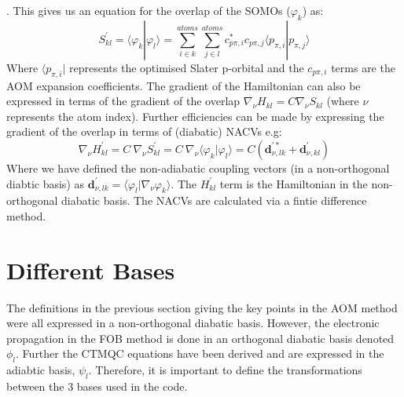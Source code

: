 \cite{spencer_fob-sh:_2016}. This gives us an equation for the overlap of the SOMOs ($\varphi_{k}$) as:
\begin{equation}
    S_{kl}^{'} = \langle \varphi_{k} | \varphi_{l} \rangle = \sum_{i \in k}^{atoms} \sum_{j \in l}^{atoms} c_{p\pi, i}^{*} c_{p\pi, j} \langle p_{\pi, i}|p_{\pi, j}\rangle
    \label{eq:P-orbital-overlap}
\end{equation}
Where $\langle p_{\pi, i} |$ represents the optimised Slater p-orbital and the $c_{p\pi, i}$ terms are the AOM expansion coefficients. The gradient of the Hamiltonian can also be expressed in terms of the gradient of the overlap $\nabla_{\nu} H_{kl} = C \nabla_{\nu} S_{kl}$ (where $\nu$ represents the atom index). Further efficiencies can be made by expressing the gradient of the overlap in terms of (diabatic) NACVs e.g:
\begin{equation}
  \nabla_{\nu} H_{kl}^{'} = C \ \nabla_{\nu} S_{kl}^{'} = C \ \nabla_{\nu} \langle \varphi_{k} | \varphi_{l} \rangle = C ( \textbf{d}_{\nu, lk}^{'*} + \textbf{d}_{\nu, kl}^{'} )
\end{equation}
Where we have defined the non-adiabatic coupling vectors (in a non-orthogonal diabtic basis) as $\textbf{d}^{'}_{\nu, lk} = \langle \varphi_{l}  | \nabla_{\nu} \varphi_{k}\rangle$. The $H^{'}_{kl}$ term is the Hamiltonian in the non-orthogonal diabatic basis. The NACVs are calculated via a fintie difference method.

\section{Different Bases}
The definitions in the previous section giving the key points in the AOM method were all expressed in a non-orthogonal diabatic basis. However, the electronic propagation in the FOB method is done in an orthogonal diabatic basis denoted $\phi_{l}$. Further the CTMQC equations have been derived and are expressed in the adiabtic basis, $\psi_{l}$. Therefore, it is important to define the transformations between the 3 bases used in the code.
